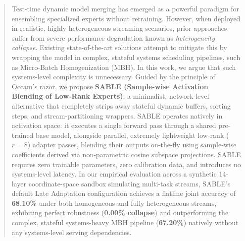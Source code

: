 \begin{abstract}
Test-time dynamic model merging has emerged as a powerful paradigm for ensembling specialized experts without retraining. However, when deployed in realistic, highly heterogeneous streaming scenarios, prior approaches suffer from severe performance degradation known as \emph{heterogeneity collapse}. Existing state-of-the-art solutions attempt to mitigate this by wrapping the model in complex, stateful systems scheduling pipelines, such as Micro-Batch Homogenization (MBH). In this work, we argue that such systems-level complexity is unnecessary. Guided by the principle of Occam's razor, we propose \textbf{SABLE (Sample-wise Activation Blending of Low-Rank Experts)}, a minimalist, network-level alternative that completely strips away stateful dynamic buffers, sorting steps, and stream-partitioning wrappers. SABLE operates natively in activation space: it executes a single forward pass through a shared pre-trained base model, alongside parallel, extremely lightweight low-rank ($r=8$) adapter passes, blending their outputs on-the-fly using sample-wise coefficients derived via non-parametric cosine subspace projections. SABLE requires zero trainable parameters, zero calibration data, and introduces no systems-level latency. In our empirical evaluation across a synthetic 14-layer coordinate-space sandbox simulating multi-task streams, SABLE's default Late Adaptation configuration achieves a flatline joint accuracy of \textbf{68.10\%} under both homogeneous and fully heterogeneous streams, exhibiting perfect robustness (\textbf{0.00\% collapse}) and outperforming the complex, stateful systems-heavy MBH pipeline (\textbf{67.20\%}) natively without any systems-level serving dependencies.
\end{abstract}
